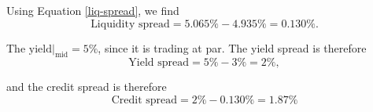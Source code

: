 \documentclass[../notes_compiled.tex]{subfiles}
\begin{document}
\begin{itemize}
{\item[] Using Equation \ref{liq-spread}, we find
\begin{equation*}
\text{Liquidity spread} = 5.065\% - 4.935\% = 0.130\%.
\end{equation*}

The $\text{yield}|_{\text{mid}}=5\%$, since it is trading at par. The yield spread is therefore
\begin{equation*}
\text{Yield spread} = 5\% - 3\% = 2\%,
\end{equation*}

and the credit spread is therefore
\begin{equation*}
\text{Credit spread} = 2\% - 0.130\% = 1.87\%
\end{equation*}
}

\end{itemize}
\end{document}
